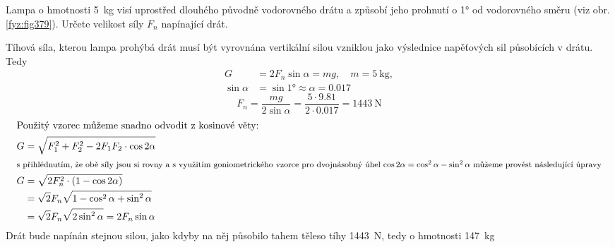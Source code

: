 \begin{mdframed}[style=mdexam]
  \begin{example}\label{fyz:fey_exam011}
    Lampa o hmotnosti \SI{5}{\kg} visí uprostřed dlouhého původně vodorovného drátu a způsobí jeho
    prohnutí o \ang{1} od vodorovného směru (viz obr. \ref{fyz:fig379}). Určete velikost síly
    \(F_n\) napínající drát. 
        
    {\centering
    \captionsetup{type=figure}
    \par}
    
    Tíhová síla, kterou lampa prohýbá drát musí být vyrovnána vertikální silou vzniklou jako
    výslednice napěťových sil působících v drátu. Tedy
    \begin{align*}
               G &= 2F_n\sin\alpha = mg, \quad m = \SI{5}{\kg},   \\
      \sin\alpha &= \sin\ang{1} \approx \alpha = \num{0.017}
    \end{align*}
    \begin{equation*}
      F_n = \frac{mg}{2\sin\alpha} = \frac{\num{5}\cdot\num{9.81}}{2\cdot\num{0.017}}
          = \SI{1443}{\newton}
    \end{equation*}
    \begin{align*}
      \shortintertext{Použitý vzorec můžeme snadno odvodit z kosinové věty:}
      G &= \sqrt{F_1^2 + F_2^2 - 2F_1F_2\cdot\cos2\alpha}   \\
      \shortintertext{\footnotesize s přihlédnutím, že obě síly jsou si rovny a s využitím  
        goniometrického vzorce pro dvojnásobný úhel \(\cos2\alpha = \cos^2\alpha - \sin^2\alpha\) 
        můžeme provést následující úpravy} 
      G &= \sqrt{2F_n^2\cdot(1-\cos2\alpha)}                 \\
        &=\sqrt{2}F_n\sqrt{1-\cos^2\alpha+\sin^2\alpha}      \\
        &=\sqrt{2}F_n\sqrt{2\sin^2\alpha} = 2F_n\sin\alpha
    \end{align*}
    Drát bude napínán stejnou silou, jako kdyby na něj působilo tahem těleso tíhy
    \SI{1443}{\newton}, tedy o hmotnosti \SI{147}{\kg}
  \end{example}
\end{mdframed}  